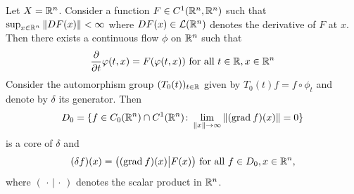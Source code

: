 \begin{example}\label{ex:b2-3.15}
Let $X = \mathbb{R}^{n}$.
Consider a function $F \in C^{1}(\mathbb{R}^{n},\mathbb{R}^{n})$ such that $\sup_{x \in \mathbb{R}^{n}} \|DF(x)\| < \infty$ where $DF(x) \in \mathcal{L}(\mathbb{R}^{n})$ denotes the derivative of\/ $F$ at $x$.
Then there exists a continuous flow $\phi$ on $\mathbb{R}^{n}$ such that
\begin{equation}\label{eq:b2-3.20}
\frac{\partial}{\partial t} \phi(t,x) = F(\phi(t,x)) \text{ for all } t \in \R, x \in \R^{n}
\end{equation}
Consider the automorphism group $(T_{0}(t))_{t \in \mathbb{R}}$ given by $T_{0}(t)f = f \circ \phi_{t}$
and denote by $\delta$ its generator.
Then 
\[D_{0} = \{ f \in C_{0}(\mathbb{R}^{n}) \cap C^{1}(\mathbb{R}^{n}) \colon \lim_{\|x\| \to \infty} \|(\mathrm{grad}\: f)(x)\| = 0 \}
\]
is a core of\/ $\delta$ and
\begin{equation}\label{eq:b2-3.21}
(\delta f)(x) = \big((\mathrm{grad}\: f)(x) \big| F(x)\big) \text{ for all } f \in D_{0}, x \in \mathbb{R}^{n},
\end{equation}
where $(\,\cdot\,|\,\cdot\,)$
denotes the scalar product in $\mathbb{R}^{n}$.
\end{example}
